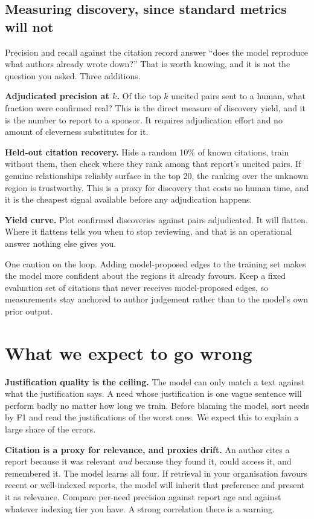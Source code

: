 \documentclass[11pt]{article}
\begin{document}
\subsection{Measuring discovery, since standard metrics will not}

Precision and recall against the citation record answer ``does the model
reproduce what authors already wrote down?'' That is worth knowing, and it is not
the question you asked. Three additions.

\textbf{Adjudicated precision at $k$.} Of the top $k$ uncited pairs sent to a
human, what fraction were confirmed real? This is the direct measure of
discovery yield, and it is the number to report to a sponsor. It requires
adjudication effort and no amount of cleverness substitutes for it.

\textbf{Held-out citation recovery.} Hide a random 10\% of known citations,
train without them, then check where they rank among that report's uncited
pairs. If genuine relationships reliably surface in the top 20, the ranking over
the unknown region is trustworthy. This is a proxy for discovery that costs no
human time, and it is the cheapest signal available before any adjudication
happens.

\textbf{Yield curve.} Plot confirmed discoveries against pairs adjudicated. It
will flatten. Where it flattens tells you when to stop reviewing, and that is an
operational answer nothing else gives you.

One caution on the loop. Adding model-proposed edges to the training set makes
the model more confident about the regions it already favours. Keep a fixed
evaluation set of citations that never receives model-proposed edges, so
measurements stay anchored to author judgement rather than to the model's own
prior output.

\section{What we expect to go wrong}

\textbf{Justification quality is the ceiling.} The model can only match a text
against what the justification says. A need whose justification is one vague
sentence will perform badly no matter how long we train. Before blaming the
model, sort needs by F1 and read the justifications of the worst ones. We expect
this to explain a large share of the errors.

\textbf{Citation is a proxy for relevance, and proxies drift.} An author cites a
report because it was relevant \emph{and} because they found it, could access it,
and remembered it. The model learns all four. If retrieval in your organisation
favours recent or well-indexed reports, the model will inherit that preference
and present it as relevance. Compare per-need precision against report age and
against whatever indexing tier you have. A strong correlation there is a warning.
\end{document}
